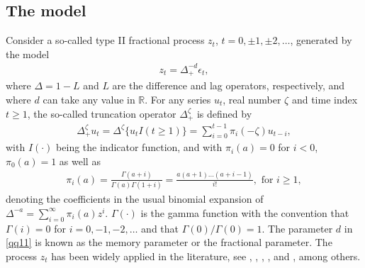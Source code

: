 {{\subsection{The model}
\label{model}

Consider a so-called type II fractional process $z_t$, $t = 0,\pm 1,\pm 2,\ldots$, generated by the model
\begin{align}
    z_t = \Delta_+^{-d} \epsilon_t, \label{qq11} 
\end{align} 
where $\Delta = 1 - L$ and $L$ are the difference and lag operators, respectively, and where $d$ can take any value in $\mathbb{R}$. For any series $u_t$, real number $\zeta$ and time index $t \geq 1$, the so-called truncation
operator $\Delta_+^{\zeta}$ is defined by
\begin{align}
    \Delta_+^{\zeta} u_t  = \Delta^{\zeta} \{ u_t I(t \geq 1)  \} = \sum_{i = 0}^{t-1} \pi_{i}(-\zeta) u_{t-i},  \label{e33}
\end{align}
with $I(\cdot)$ being the indicator function, and with $\pi_{i}(a) = 0$ for $i<0$, $\pi_{0}(a) = 1$ as well as
\begin{align}
    \pi_{i}(a) = \frac{\Gamma(a+i)}{\Gamma(a)\Gamma(1+i)}= \frac{a (a+1) \ldots (a+i-1)}{i!}, \text{ for } i \geq 1, \label{fracpar}
\end{align}
denoting the coefficients in the usual binomial expansion of $\Delta^{-a} = \sum_{i = 0}^{\infty} \pi_i(a) z^i$.  $\Gamma(\cdot)$ is the gamma function with the convention that $\Gamma(i) = 0$ for $i = 0 ,-1,-2,\ldots$ and that
$\Gamma(0)/\Gamma(0) = 1$. The parameter $d$ in \eqref{qq11} is known as the memory parameter or the fractional parameter. The process $z_{t}$ has been widely applied in the literature, see
\textcite{marinucci2000weak,marinucci2001semiparametric}, \textcite{robinson2003cointegration}, \textcite{nielsen2004efficient}, \textcite{shimotsu2005exact}, \textcite{robinson2005distance} and
\textcite{johansen2008representation}, among others.

}}
